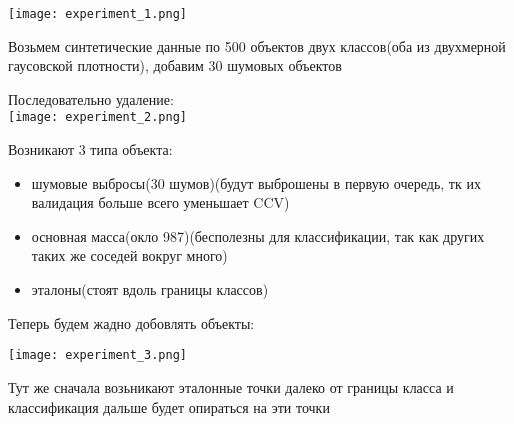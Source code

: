 \texttt{[image: experiment\_1.png]}

Возьмем синтетические данные по 500 объектов двух классов(оба из двухмерной гаусовской плотности), добавим 30 шумовых объектов

Последовательно удаление: \\
\texttt{[image: experiment\_2.png]}

Возникают 3 типа объекта:
\begin{itemize}
    \item шумовые выбросы(30 шумов)(будут выброшены в первую очередь, тк их валидация больше всего уменьшает CCV)
    \item основная масса(окло 987)(бесполезны для классификации, так как других таких же соседей вокруг много)
    \item эталоны(стоят вдоль границы классов)
\end{itemize}

Теперь будем жадно добовлять объекты:


\texttt{[image: experiment\_3.png]}

Тут же сначала возьникают эталонные точки далеко от границы класса и классификация дальше будет опираться на эти точки 

